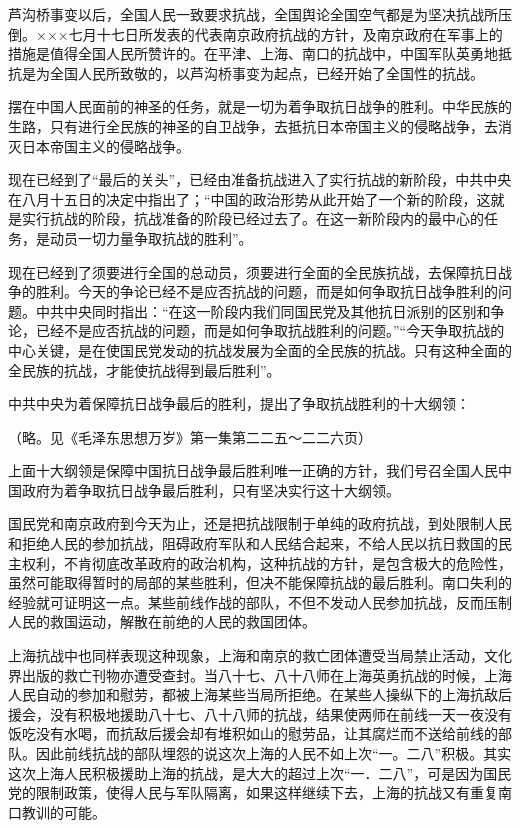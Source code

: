 芦沟桥事变以后，全国人民一致要求抗战，全国舆论全国空气都是为坚决抗战所压倒。×××七月十七日所发表的代表南京政府抗战的方针，及南京政府在军事上的措施是值得全国人民所赞许的。在平津、上海、南口的抗战中，中国军队英勇地抵抗是为全国人民所致敬的，以芦沟桥事变为起点，已经开始了全国性的抗战。

摆在中国人民面前的神圣的任务，就是一切为着争取抗日战争的胜利。中华民族的生路，只有进行全民族的神圣的自卫战争，去抵抗日本帝国主义的侵略战争，去消灭日本帝国主义的侵略战争。

现在已经到了“最后的关头”，已经由准备抗战进入了实行抗战的新阶段，中共中央在八月十五日的决定中指出了；“中国的政治形势从此开始了一个新的阶段，这就是实行抗战的阶段，抗战准备的阶段已经过去了。在这一新阶段内的最中心的任务，是动员一切力量争取抗战的胜利”。

现在已经到了须要进行全国的总动员，须要进行全面的全民族抗战，去保障抗日战争的胜利。今天的争论已经不是应否抗战的问题，而是如何争取抗日战争胜利的问题。中共中央同时指出：“在这一阶段内我们同国民党及其他抗日派别的区别和争论，已经不是应否抗战的问题，而是如何争取抗战胜利的问题。”“今天争取抗战的中心关键，是在使国民党发动的抗战发展为全面的全民族的抗战。只有这种全面的全民族的抗战，才能使抗战得到最后胜利”。

中共中央为着保障抗日战争最后的胜利，提出了争取抗战胜利的十大纲领：

（略。见《毛泽东思想万岁》第一集第二二五～二二六页）

上面十大纲领是保障中国抗日战争最后胜利唯一正确的方针，我们号召全国人民中国政府为着争取抗日战争最后胜利，只有坚决实行这十大纲领。

国民党和南京政府到今天为止，还是把抗战限制于单纯的政府抗战，到处限制人民和拒绝人民的参加抗战，阻碍政府军队和人民结合起来，不给人民以抗日救国的民主权利，不肯彻底改革政府的政治机构，这种抗战的方针，是包含极大的危险性，虽然可能取得暂时的局部的某些胜利，但决不能保障抗战的最后胜利。南口失利的经验就可证明这一点。某些前线作战的部队，不但不发动人民参加抗战，反而压制人民的救国运动，解散在前绝的人民的救国团体。

上海抗战中也同样表现这种现象，上海和南京的救亡团体遭受当局禁止活动，文化界出版的救亡刊物亦遭受查封。当八十七、八十八师在上海英勇抗战的时候，上海人民自动的参加和慰劳，都被上海某些当局所拒绝。在某些人操纵下的上海抗敌后援会，没有积极地援助八十七、八十八师的抗战，结果使两师在前线一天一夜没有饭吃没有水喝，而抗敌后援会却有堆积如山的慰劳品，让其腐烂而不送给前线的部队。因此前线抗战的部队埋怨的说这次上海的人民不如上次“一。二八”积极。其实这次上海人民积极援助上海的抗战，是大大的超过上次“一．二八”，可是因为国民党的限制政策，使得人民与军队隔离，如果这样继续下去，上海的抗战又有重复南口教训的可能。

